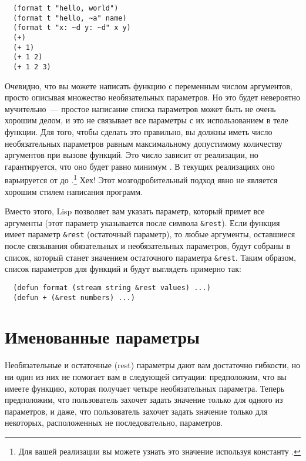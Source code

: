 \begin{lstlisting}
  (format t "hello, world")
  (format t "hello, ~a" name)
  (format t "x: ~d y: ~d" x y)
  (+)
  (+ 1)
  (+ 1 2)
  (+ 1 2 3)
\end{lstlisting}

Очевидно, что вы можете написать функцию с переменным числом аргументов, просто описывая
множество необязательных параметров.  Но это будет невероятно мучительно~--- простое
написание списка параметров может быть не очень хорошим делом, и это не связывает все
параметры с их использованием в теле функции.  Для того, чтобы сделать это правильно, вы
должны иметь число необязательных параметров равным максимальному допустимому количеству
аргументов при вызове функций.  Это число зависит от реализации, но гарантируется, что оно
будет равно минимум .  В текущих реализациях оно варьируется от  до
.\footnote{Для вашей реализации вы можете узнать это значение используя
  константу .}  Хех!  Этот мозгодробительный подход явно не
является хорошим стилем написания программ.

Вместо этого, Lisp позволяет вам указать параметр, который примет все аргументы (этот
параметр указывается после символа \lstinline!&rest!).  Если функция имеет параметр
\lstinline!&rest! (остаточный параметр), то любые аргументы, оставшиеся после связывания
обязательных и необязательных параметров, будут собраны в список, который станет значением
остаточного параметра \lstinline!&rest!.  Таким образом, список параметров для функций
 и \code{+} будут выглядеть примерно так:

\begin{lstlisting}
  (defun format (stream string &rest values) ...)
  (defun + (&rest numbers) ...) 
\end{lstlisting}

\section{Именованные параметры}

Необязательные и остаточные (rest) параметры дают вам достаточно гибкости, но ни один из
них не помогает вам в следующей ситуации: предположим, что вы имеете функцию, которая
получает четыре необязательных параметра.  Теперь предположим, что пользователь захочет
задать значение только для одного из параметров, и даже, что пользователь захочет задать
значение только для некоторых, расположенных не последовательно, параметров.

